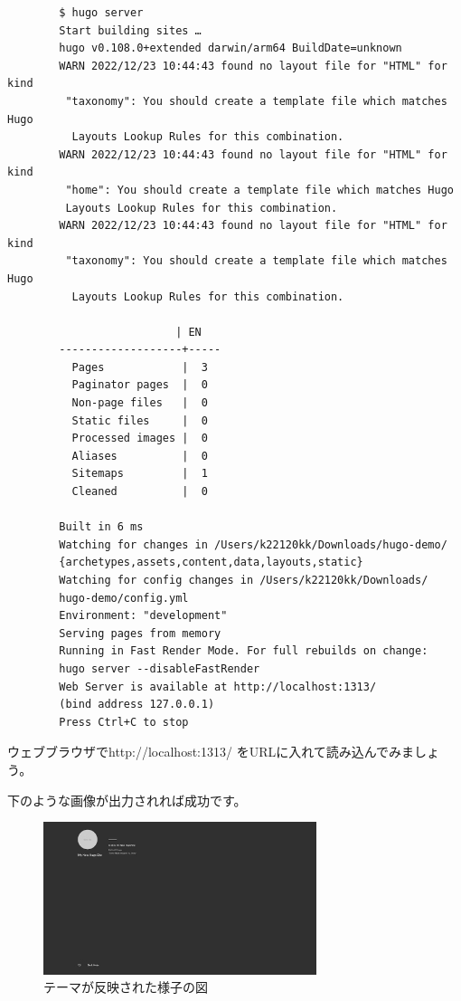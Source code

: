     \begin{shaded}
      \begin{verbatim}
        $ hugo server
        Start building sites … 
        hugo v0.108.0+extended darwin/arm64 BuildDate=unknown
        WARN 2022/12/23 10:44:43 found no layout file for "HTML" for kind
         "taxonomy": You should create a template file which matches Hugo
          Layouts Lookup Rules for this combination.
        WARN 2022/12/23 10:44:43 found no layout file for "HTML" for kind
         "home": You should create a template file which matches Hugo 
         Layouts Lookup Rules for this combination.
        WARN 2022/12/23 10:44:43 found no layout file for "HTML" for kind
         "taxonomy": You should create a template file which matches Hugo
          Layouts Lookup Rules for this combination.

                          | EN  
        -------------------+-----
          Pages            |  3  
          Paginator pages  |  0  
          Non-page files   |  0  
          Static files     |  0  
          Processed images |  0  
          Aliases          |  0  
          Sitemaps         |  1  
          Cleaned          |  0  

        Built in 6 ms
        Watching for changes in /Users/k22120kk/Downloads/hugo-demo/
        {archetypes,assets,content,data,layouts,static}
        Watching for config changes in /Users/k22120kk/Downloads/
        hugo-demo/config.yml
        Environment: "development"
        Serving pages from memory
        Running in Fast Render Mode. For full rebuilds on change: 
        hugo server --disableFastRender
        Web Server is available at http://localhost:1313/ 
        (bind address 127.0.0.1)
        Press Ctrl+C to stop
      \end{verbatim}  
    \end{shaded}

    ウェブブラウザでhttp://localhost:1313/ をURLに入れて読み込んでみましょう。

    下のような画像が出力されれば成功です。

    \begin{figure}[H]
      \centering
      \includegraphics[width=8cm]{./image/02-chap5/output-homepage.png}
      \caption{テーマが反映された様子の図}
      \label{chap5-homepage-image}
    \end{figure}

